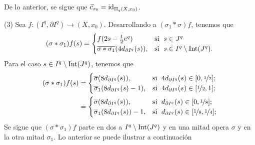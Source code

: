 \begin{dem}
    De lo anterior, se sigue que $\vec{c}_{x_0}=\mathrm{id}_{\Pi_q(X,x_0)}$.

    (3) Sea $f:(I^q,\partial I^q)\to (X,x_0)$. Desarrollando a $(\sigma_1*\sigma)f$, tenemos que
    \begin{equation*}
        (\sigma*\sigma_1)f(s)=\begin{cases}
        f(2s-\frac{1}{2}e^q) & \text{si \;} s\in J^q\\
         \overline{\sigma*\sigma_1}(4d_{\partial I^q}(s)), & \text{si \;} s\in I^q\setminus\mathrm{Int}(J^q).\\
         \end{cases}
    \end{equation*}
    Para el caso $s\in I^q\setminus\mathrm{Int}(J^q)$, tenemos que
    \begin{align*}
        (\sigma*\sigma_1)f(s)&=\begin{cases}
        \overline{\sigma}(8d_{\partial I^q}(s)), & \text{si \;} 4d_{\partial I^q}(s)\in [0,\nicefrac{1}{2}];\\
        \overline{\sigma}_1(8d_{\partial I^q}(s)-1), & \text{si \;} 4d_{\partial I^q}(s)\in [\nicefrac{1}{2},1];
         \end{cases}\\
         &=\begin{cases}
        \overline{\sigma}(8d_{\partial I^q}(s)), & \text{si \;} d_{\partial I^q}(s)\in [0,\nicefrac{1}{8}];\\
        \overline{\sigma}_1(8d_{\partial I^q}(s))-1, & \text{si \;} d_{\partial I^q}(s)\in [\nicefrac{1}{8},\nicefrac{1}{4}];
         \end{cases}
    \end{align*}
    Se sigue que $(\sigma*\sigma_1)f$ parte en dos a $I^q\setminus\mathrm{Int}(J^q)$ y en una mitad opera $\sigma$ y en la otra mitad $\sigma_1$. Lo anterior se puede ilustrar a continuación  
    \begin{center}
\end{center}
\end{dem}
